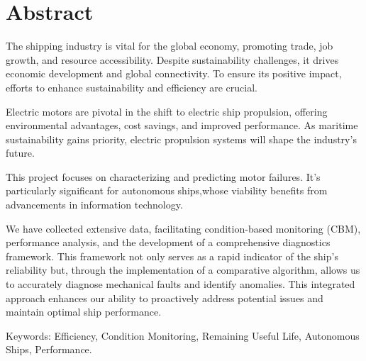 \section*{Abstract}
\label{sec:Abstract}
 The shipping industry is vital for the global economy, promoting trade, job growth, and resource accessibility. Despite sustainability challenges, it drives economic development and global connectivity. To ensure its positive impact, efforts to enhance sustainability and efficiency are crucial.
 
 Electric motors are pivotal in the shift to electric ship propulsion, offering environmental advantages, cost savings, and improved performance. As maritime sustainability gains priority, electric propulsion systems will shape the industry's future.
 
 This project focuses on characterizing and  predicting motor failures. It's particularly significant for autonomous ships,whose viability benefits from advancements in information technology. 
 
 We have collected extensive data, facilitating condition-based monitoring (CBM), performance analysis, and the development of a comprehensive diagnostics framework. This framework not only serves as a rapid indicator of the ship's reliability but, through the implementation of a comparative algorithm, allows us to accurately diagnose mechanical faults and identify anomalies. This integrated approach enhances our ability to proactively address potential issues and maintain optimal ship performance.
 
 Keywords: Efficiency, Condition Monitoring, Remaining Useful Life, Autonomous Ships, Performance.
 


